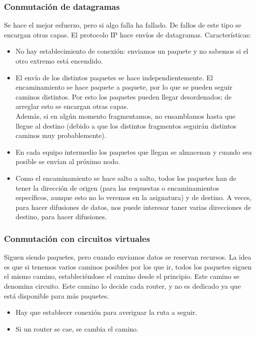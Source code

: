 \subsubsection{Conmutación de datagramas}
Se hace el mejor esfuerzo, pero si algo falla ha fallado.  De fallos de este tipo se encargan otras capas. El protocolo \acrshort{IP} hace envíos de datagramas.
Características:
\begin{itemize}
    \item No hay establecimiento de conexión: enviamos un paquete y no sabemos si el otro extremo está encendido.
    \item El envío de los distintos paquetes se hace independientemente. El encaminamiento se hace paquete a paquete, por lo que se pueden seguir caminos distintos. Por esto los paquetes pueden llegar desordenados; de arreglar esto se encargan otras capas. \\
        Además, si en algún momento fragmentamos, no ensamblamos hasta que llegue al destino (debido a que los distintos fragmentos seguirán distintos caminos muy probablemente).  
    \item En cada equipo intermedio los paquetes que llegan se almacenan y cuando sea posible se envían al próximo nodo. 
    \item Como el encaminamiento se hace salto a salto, todos los paquetes han de tener la dirección de origen (para las respuestas o encaminamientos específicos, aunque esto no lo veremos en la asignatura) y de destino. A veces, para hacer difusiones de datos, nos puede interesar taner varias direcciones de destino, para hacer difusiones.
\end{itemize}

\subsubsection{Conmutación con circuitos virtuales} 

Siguen siendo paquetes, pero cuando enviamos datos se reservan recursos. 
La idea es que si tenemos varios caminos posibles por los que ir, todos los paquetes siguen el mismo camino, estableciéndose el camino desde el principio. Este camino se denomina circuito. Este camino lo decide cada router, y no es dedicado ya que está disponible para más paquetes. 

\begin{itemize}
    \item Hay que establecer conexión para averiguar la ruta a seguir. 
    \item Si un router se cae, se cambia el camino. 
\end{itemize}



